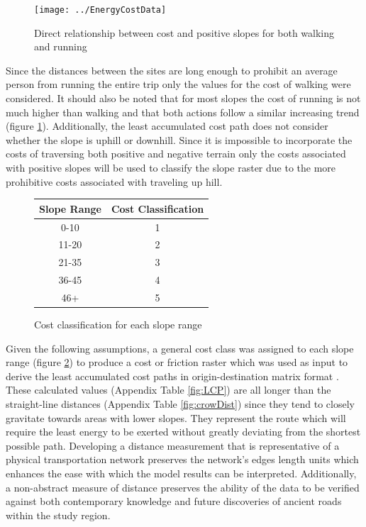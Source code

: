 \documentclass[12pt,a4paper]{thesis}
\begin{document}
\begin{figure}
\centering
\texttt{[image: ../EnergyCostData]}
\caption{Direct relationship between cost and positive slopes for both walking and running}
\label{fig:EnergyCostData}
\end{figure}



Since the distances between the sites are long enough to prohibit an average person from running the entire trip only the values for the cost of walking were considered. It should also be noted that for most slopes the cost of running is not much higher than walking and that both actions follow a similar increasing trend (figure \ref{fig:EnergyCostData}). Additionally, the least accumulated cost path does not consider whether the slope is uphill or downhill. Since it is impossible to incorporate the costs of traversing both positive and negative terrain only the costs associated with positive slopes will be used to classify the slope raster due to the more prohibitive costs associated with traveling up hill. 

\begin{figure}
\centering
\begin{tabular}{|c|c|}
\hline Slope Range & Cost Classification \\ 
\hline 0-10 & 1 \\ 
\hline 11-20 & 2 \\ 
\hline 21-35 & 3 \\ 
\hline 36-45 & 4 \\ 
\hline 46+ & 5 \\ 
\hline 
\end{tabular} 
\tablename{Cost classification for each slope range}
\label{fig:slopeClass}
\end{figure}

Given the following assumptions, a general cost class was assigned to each slope range (figure \ref{fig:slopeClass}) to produce a cost or friction raster which was used as input to derive the least accumulated cost paths in origin-destination matrix format \citep{Eth11}. These calculated values (Appendix Table \ref{fig:LCP}) are all longer than the straight-line distances (Appendix Table \ref{fig:crowDist}) since they tend to closely gravitate towards areas with lower slopes. They represent the route which will require the least energy to be exerted without greatly deviating from the shortest possible path. Developing a distance measurement that is representative of a physical transportation network preserves the network's edges length units which enhances the ease with which the model results can be interpreted. Additionally, a non-abstract measure of distance preserves the ability of the data to be verified against both contemporary knowledge and future discoveries of ancient roads within the study region.
\end{document}
